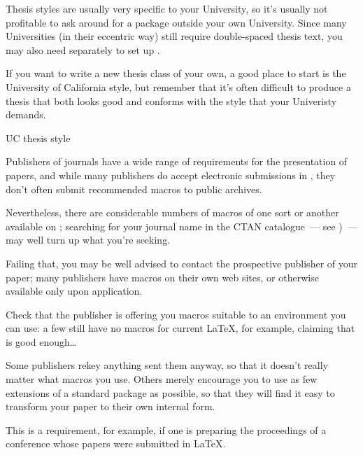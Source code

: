 
Thesis styles are usually very specific to your University, so it's
usually not profitable to ask around for a package outside your own
University.  Since many Universities (in their eccentric way) still
require double-spaced thesis text, you may also need separately to set
up .

If you want to write a new thesis class of your own, a good place to
start is the University of California style, but remember that it's
often difficult to produce a thesis that both looks good and conforms
with the style that your Univeristy demands.
\begin{ctanrefs}
\item[UC thesis style]
\end{ctanrefs}


Publishers of journals have a wide range of requirements for the
presentation of papers, and while many publishers do accept electronic
submissions in \AllTeX{}, they don't often submit recommended macros to
public archives.

Nevertheless, there are considerable numbers of macros of one sort or
another available on ; searching for your journal name in
the CTAN catalogue~--- see %
)~---
may well turn up what you're seeking.

Failing that, you may be well advised to contact the prospective
publisher of your paper; many publishers have macros on their own web
sites, or otherwise available only upon application.

Check that the publisher is offering you macros suitable to an
environment you can use: a few still have no macros for current
\LaTeX{}, for example, claiming that \LaTeXo{} is good enough\dots{}

Some publishers rekey anything sent them anyway, so that it doesn't
really matter what macros you use.  Others merely encourage you to use
as few extensions of a standard package as possible, so that they will
find it easy to transform your paper to their own internal form.


This is a requirement, for example, if one is preparing the
proceedings of a conference whose papers were submitted in \LaTeX{}.

